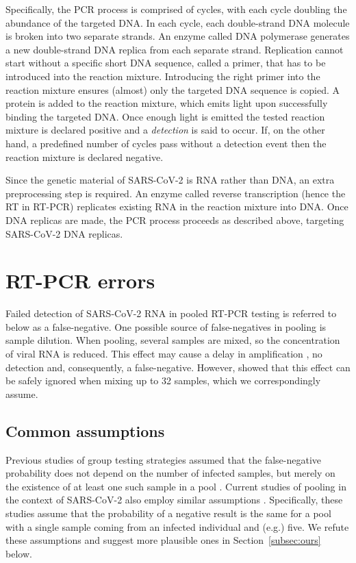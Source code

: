 \documentclass{article}
\begin{document}
Specifically, the PCR process is comprised of cycles, with each cycle
doubling the abundance of the targeted DNA. In each cycle, each
double-strand DNA molecule is broken into two separate strands. An
enzyme called DNA polymerase generates a new double-strand DNA replica
from each separate strand. Replication cannot start without a specific
short DNA sequence, called a primer, that has to be introduced into
the reaction mixture. Introducing the right primer into the reaction
mixture ensures (almost) only the targeted DNA sequence is copied. A
protein is added to the reaction mixture, which emits light upon
successfully binding the targeted DNA. Once enough light is emitted
the tested reaction mixture is declared positive and a
\emph{detection} is said to occur. If, on the other hand, a predefined
number of cycles pass without a detection event then the reaction
mixture is declared negative.

Since the genetic material of SARS-CoV-2 is RNA rather than DNA, an
extra preprocessing step is required. An enzyme called
reverse transcription (hence the RT in RT-PCR) replicates existing RNA
in the reaction mixture into DNA. Once DNA replicas are made, the PCR
process proceeds as described above, targeting SARS-CoV-2 DNA
replicas.

\section{RT-PCR errors}
Failed detection of SARS-CoV-2 RNA in pooled RT-PCR testing is
referred to below as a false-negative. One possible source of
false-negatives in pooling is sample dilution. When pooling, several
samples are mixed, so the concentration of viral RNA is reduced. This
effect may cause a delay in amplification \cite{DorfmanYuvalDor}, no
detection and, consequently, a false-negative. However, \cite{Lion}
showed that this effect can be safely ignored when mixing up to 32
samples, which we correspondingly assume.

\subsection{Common assumptions}
Previous studies of group testing strategies assumed that the
false-negative probability does not depend on the number of infected
samples, but merely on the existence of at least one such sample in a
pool \cite{Kim, OptimalDorfmanPool}. Current studies of pooling in the
context of SARS-CoV-2 also employ similar assumptions
\cite{Simplistic1, Simplistic2}. Specifically, these studies assume
that the probability of a negative result is the same for a pool with
a single sample coming from an infected individual and (e.g.)
five. We refute these assumptions and suggest more plausible ones in
Section~\ref{subsec:ours} below.
\end{document}
